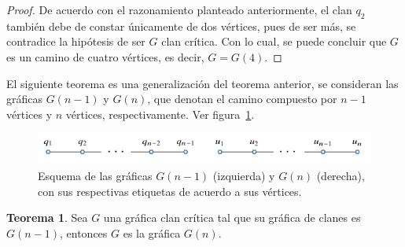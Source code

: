 \documentclass[12pt]{book}
\theoremstyle{definition}
\newtheorem{theorem}{Teorema}[chapter]
\begin{document}
\begin{proof}
De acuerdo con el razonamiento planteado anteriormente, el clan $q_2$ también debe de constar únicamente de dos vértices, pues de ser más, se contradice la hipótesis de ser $G$ clan crítica. Con lo cual, se puede concluir que $G$ es un camino de cuatro vértices, es decir, $G=G(4)$.
\end{proof}

El siguiente teorema es una generalización del teorema anterior, se consideran las gráficas $G(n-1)$ y $G(n)$, que denotan el camino compuesto por $n-1$ vértices y $n$ vértices, respectivamente. Ver figura~\ref{F6}.

\begin{figure}[!htbp]
	\centering
	\includegraphics[scale=1.2]{Fig6.pdf}
	\caption{Esquema de las gráficas $G(n-1)$ (izquierda) y $G(n)$ (derecha), con sus respectivas etiquetas de acuerdo a sus vértices.\label{F6}}
\end{figure}

\begin{theorem}
Sea $G$ una gráfica clan crítica tal que su gráfica de clanes es $G(n-1)$, entonces $G$ es la gráfica $G(n)$.
\end{theorem}
\end{document}
